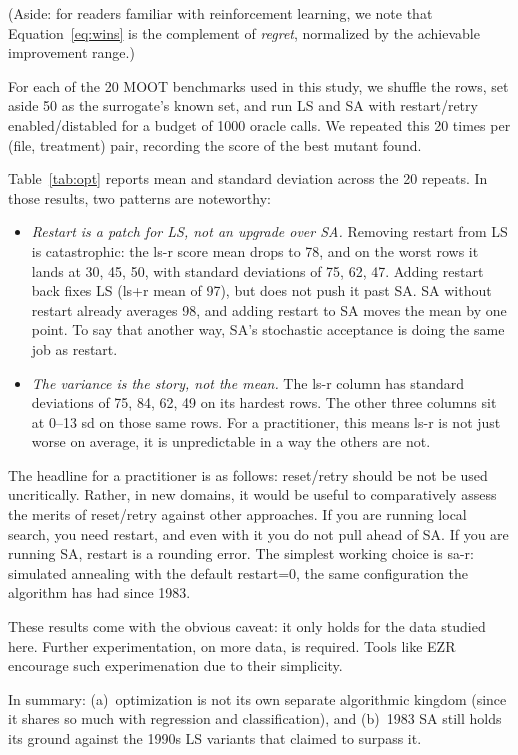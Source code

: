 \documentclass[AMA,STIX2COL]{WileyNJDv5}
\begin{document}
{(Aside: for readers familiar with reinforcement learning,
we note that Equation~\ref{eq:wins} is the
complement of {\em regret}, normalized by the achievable
improvement range.)


 For each of the 20 MOOT benchmarks used in this study, we shuffle the
rows, set aside 50 as the surrogate's known set, and run 
LS and SA with restart/retry enabled/distabled
for a budget of 1000 oracle calls. We repeated
this 20 times per (file, treatment) pair, recording the score of
the best mutant found.

 Table~\ref{tab:opt} reports mean and standard
deviation across the 20 repeats. 
In those results, two patterns are noteworthy:
\begin{itemize}
\item
\textit{Restart is a patch for LS, not an upgrade over SA.}
Removing restart from LS is catastrophic: the \textsf{ls-r} score mean
drops to 78, and on the worst rows it lands at 30, 45, 50, with
standard deviations of 75, 62, 47.   Adding restart back fixes
LS (\textsf{ls+r} mean of 97), but does not push it past SA. SA
without restart already averages 98, and adding restart to SA
moves the mean by one point. 
To say that another way,  
SA's stochastic acceptance is doing
the same job as restart.
\item
\textit{The variance is the story, not the mean.} The \textsf{ls-r}
column has standard deviations of 75, 84, 62, 49 on its hardest
rows. The other three columns sit at 0--13 sd on those same rows.
For a practitioner, this means \textsf{ls-r} is not just worse on
average, it is unpredictable in a way the others are not.  
\end{itemize}
The headline for a practitioner is as follows:
 reset/retry should be not be used uncritically.
Rather, in new domains, it would be useful to comparatively
assess the merits of reset/retry against other approaches.
If you are running local search,
you need restart, and even with it you do not pull ahead of SA.
If you are running SA, restart is a rounding error. The simplest
working choice is \textsf{sa-r}: simulated annealing with the
default \textsf{restart=0}, the same configuration the algorithm
has had since 1983.

These results come with the obvious caveat: it only holds
for the data studied here. Further experimentation, on more data,
is required.  Tools like EZR encourage such experimenation
due to their simplicity.  

In summary: (a)~optimization is not its own
separate algorithmic kingdom (since it shares so much with regression and classification), 
and (b)~1983 SA still holds its ground against
the 1990s LS variants that claimed to surpass it.

}
\end{document}
